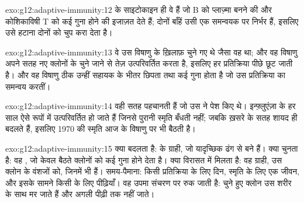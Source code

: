 \begin{solution}{exo:g12:adaptive-immunity:12}
 के साइटोकाइन ही वे हैं जो B  को प्लाज़्मा 
बनने की और कोशिकाविषी T  को कई गुना होने की इजाज़त देते हैं; दोनों
बाँहें उसी एक समन्वयक पर निर्भर हैं, इसलिए उसे हटाना दोनों को चुप करा देता है।
\end{solution}

\begin{solution}{exo:g12:adaptive-immunity:13}
वे  उस विषाणु के ख़िलाफ़ चुने गए थे जैसा वह था; और वह विषाणु अपने
सतह  नए क्लोनों के चुने जाने से तेज़ उत्परिवर्तित करता है, इसलिए हर
प्रतिक्रिया पीछे छूट जाती है। और वह विषाणु ठीक उन्हीं सहायक  के भीतर
छिपता तथा कई गुना होता है जो उस प्रतिक्रिया का समन्वय करतीं।
\end{solution}

\begin{solution}{exo:g12:adaptive-immunity:14}
 वही सतह  पहचानती हैं जो उस  ने पेश किए थे।
इन्फ़्लुएंज़ा के हर साल ऐसे रूपों में उत्परिवर्तित हो जाते हैं जिनसे पुरानी
स्मृति बँधती नहीं; जबकि ख़सरे के सतह  शायद ही बदलते हैं, इसलिए 1970
की स्मृति आज के विषाणु पर भी बैठती है।
\end{solution}

\begin{solution}{exo:g12:adaptive-immunity:15}
क्या बदलता है:  के ग्राही, जो यादृच्छिक ढंग से बने हैं। क्या चुनता
है: वह , जो केवल बैठते क्लोनों को कई गुना होने देता है। क्या विरासत
में मिलता है: वह ग्राही, उस क्लोन के वंशजों को, जिनमें  भी
हैं। समय-पैमाना: किसी प्रतिक्रिया के लिए दिन, स्मृति के लिए एक जीवन, और
इसके सामने किसी  के लिए पीढ़ियाँ। वह उपमा संचरण पर रुक जाती है: चुने
हुए क्लोन उस शरीर के साथ मर जाते हैं और अगली पीढ़ी तक नहीं जाते।
\end{solution}

